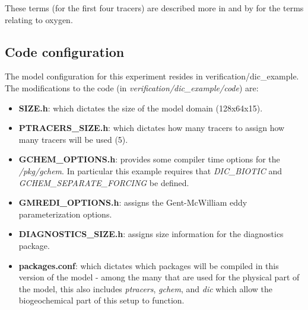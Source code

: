These terms (for the first four tracers) are described more in
\cite{Dutkiewicz_etal_05} and by \cite{McKinley_etal_04} for the terms
relating to oxygen.


\subsection{Code configuration}

The model configuration for this experiment resides in
verification/dic\_example. The modifications to the code (in {\it
  verification/dic\_example/code}) are:
\begin{itemize}
\item{{\bf SIZE.h}: which dictates the size of the model domain
    (128x64x15).}
\item{\bf PTRACERS\_SIZE.h}: which dictates how many tracers to assign
  how many tracers will be used (5).
\item{\bf GCHEM\_OPTIONS.h}: provides some compiler time options for
  the {\it /pkg/gchem}. In particular this example requires that {\it
    DIC\_BIOTIC} and {\it GCHEM\_SEPARATE\_FORCING} be defined.
\item{\bf GMREDI\_OPTIONS.h}: assigns the Gent-McWilliam eddy
  parameterization options.
\item{\bf DIAGNOSTICS\_SIZE.h}: assigns size information for the
  diagnostics package.
\item{\bf packages.conf}: which dictates which packages will be
  compiled in this version of the model - among the many that are used
  for the physical part of the model, this also includes {\it
    ptracers}, {\it gchem}, and {\it dic} which allow the
  biogeochemical part of this setup to function.
\end{itemize}

